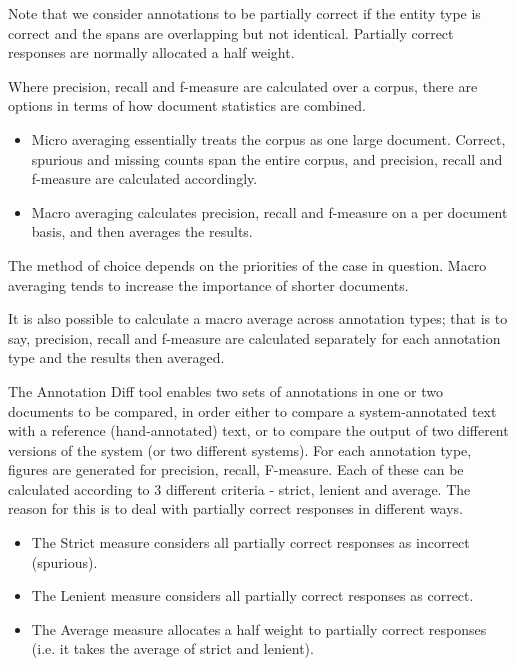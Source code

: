 Note that we consider annotations to be partially correct if the
entity type is correct and the spans are overlapping but not
identical. Partially correct responses are normally allocated a half
weight.


Where precision, recall and f-measure are calculated over a corpus, there are
options in terms of how document statistics are combined.

\begin{itemize}
  \item Micro averaging essentially treats the corpus as one large document.
  Correct, spurious and missing counts span the entire corpus, and precision,
  recall and f-measure are calculated accordingly.
  \item Macro averaging calculates precision, recall and f-measure on a per
  document basis, and then averages the results.
\end{itemize}

The method of choice depends on the priorities of the case in question. Macro
averaging tends to increase the importance of shorter documents.

It is also possible to calculate a macro average across annotation types; that
is to say, precision, recall and f-measure are calculated separately for each
annotation type and the results then averaged.

%
The Annotation Diff tool enables two sets of annotations in one or two
documents to be compared, in order either to compare a system-annotated
text with a reference (hand-annotated) text, or to compare the output
of two different versions of the system (or two different
systems). For each annotation type, figures are generated for
precision, recall, F-measure.
Each of these can be calculated according to 3 different
criteria - strict, lenient and average. The reason for this is to deal
with partially correct responses in different ways.
\begin{itemize}
\item The Strict measure considers all partially correct
responses as incorrect (spurious).
\item The Lenient measure considers all partially correct
responses as correct.
\item The Average measure allocates a half weight to
partially correct responses (i.e. it takes the average of strict
and lenient).
\end{itemize}

